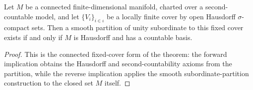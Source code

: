 \begin{lemma}
  \label{lem:dc-ch0-5-6-fixed-cover}


  Let $M$ be a connected finite-dimensional manifold, charted over a second-countable model,
  and let $\{V_i\}_{i\in\iota}$ be a locally finite cover by open Hausdorff $\sigma$-compact
  sets. Then a smooth partition of unity subordinate to this fixed cover exists if and only if
  $M$ is Hausdorff and has a countable basis.
\end{lemma}
\begin{proof}

  This is the connected fixed-cover form of the theorem: the forward implication obtains the
  Hausdorff and second-countability axioms from the partition, while the reverse implication
  applies the smooth subordinate-partition construction to the closed set $M$ itself.
\end{proof}
